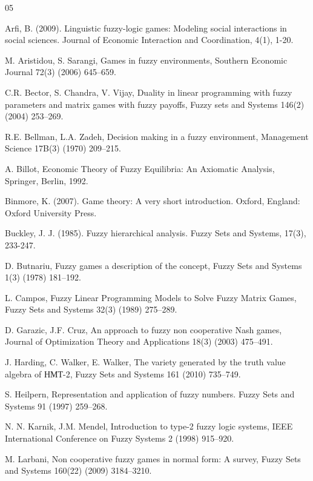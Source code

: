 \documentclass[14pt, a4paper, oneside]{extarticle}
\numberwithin{equation}{section}
\begin{document}
\clearpage
\begin{thebibliography}{05}
{

 Arfi, B. (2009). Linguistic fuzzy-logic games: Modeling social interactions in social sciences. Journal of Economic Interaction and Coordination, 4(1), 1-20.

 M. Aristidou, S. Sarangi, Games in fuzzy environments, Southern Economic Journal 72(3) (2006) 645–659.

 C.R. Bector, S. Chandra, V. Vijay, Duality in linear programming with fuzzy parameters and matrix games with fuzzy payoffs, Fuzzy sets and Systems 146(2) (2004) 253–269.

 R.E. Bellman, L.A. Zadeh, Decision making in a fuzzy environment, Management Science 17B(3) (1970) 209–215.

 A. Billot, Economic Theory of Fuzzy Equilibria: An Axiomatic Analysis, Springer, Berlin, 1992.

 Binmore, K. (2007). Game theory: A very short introduction. Oxford, England: Oxford University Press.

 Buckley, J. J. (1985). Fuzzy hierarchical analysis. Fuzzy Sets and Systems, 17(3), 233-247.

 D. Butnariu, Fuzzy games a description of the concept, Fuzzy Sets and Systems 1(3) (1978) 181–192.

 L. Campos, Fuzzy Linear Programming Models to Solve Fuzzy Matrix Games, Fuzzy Sets and Systems 32(3) (1989) 275–289.

 D. Garazic, J.F. Cruz, An approach to fuzzy non cooperative Nash games, Journal of Optimization Theory and Applications 18(3) (2003) 475–491.

 J. Harding, C. Walker, E. Walker, The variety generated by the truth value algebra of НМТ-2, Fuzzy Sets and Systems 161 (2010) 735–749.

 S. Heilpern, Representation and application of fuzzy numbers. Fuzzy Sets and Systems 91 (1997) 259–268.

 N. N. Karnik, J.M. Mendel, Introduction to type-2 fuzzy logic systems, IEEE International Conference on Fuzzy Systems 2 (1998) 915–920.

 M. Larbani, Non cooperative fuzzy games in normal form: A survey, Fuzzy Sets and Systems 160(22) (2009) 3184–3210.

}
\end{thebibliography}
\end{document}
